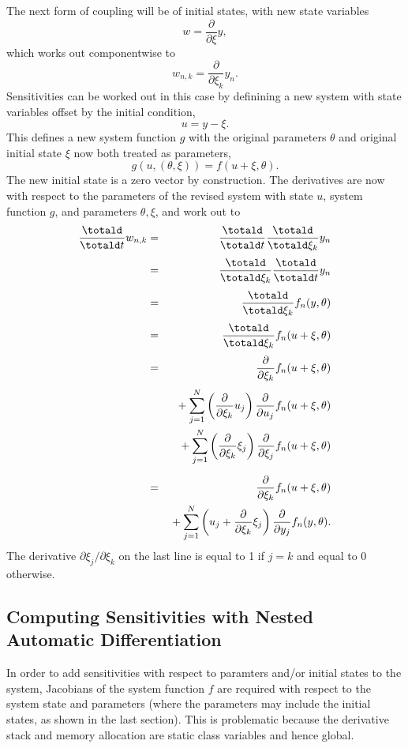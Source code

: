 \documentclass[10pt]{article}
\begin{document}
The next form of coupling will be of initial states, with new state
variables
\[
w = \frac{\partial}{\partial \xi} y,
\]
which works out componentwise to
\[
w_{n,k} = \frac{\partial}{\partial \xi_{k}} y_n.
\]
Sensitivities can be worked out in this case by definining a new
system with state variables offset by the initial condition,
\[
u = y - \xi.
\]
This defines a new system function $g$ with the original parameters
$\theta$ and original initial state $\xi$ now both treated as
parameters,
\[
g(u,(\theta,\xi)) = f(u + \xi, \theta).
\]
The new initial state is a zero vector by construction.  The
derivatives are now with respect to the parameters of the revised
system with state $u$, system function $g$, and parameters
$\theta,\xi$, and work out to
%
\begin{eqnarray*}
\frac{\totald}{\totald t} w_{n,k}
& = & \frac{\totald}{\totald t} \frac{\totald}{\totald \xi_{k}} y_n
\\[3pt]
& = & \frac{\totald}{\totald \xi_k} \frac{\totald}{\totald t} y_n
\\[3pt]
& = & \frac{\totald}{\totald \xi_k} f_n(y,\theta)
\\[3pt]
& = & \frac{\totald}{\totald \xi_k} f_n(u + \xi, \theta)
\\[3pt]
& = & \frac{\partial}{\partial \xi_k} f_n(u + \xi, \theta)
\\[3pt]
& & 
{ } + \sum_{j=1}^N 
        \left( \frac{\partial}{\partial \xi_k} u_j \right)
           \frac{\partial}{\partial u_j} f_n(u + \xi, \theta)
\\
& & 
 { } + \sum_{j=1}^N
         \left( \frac{\partial}{\partial \xi_k} \xi_j \right)
         \frac{\partial}{\partial \xi_j} f_n(u + \xi, \theta)
\\[6pt]
& = & 
\frac{\partial}{\partial \xi_k} f_n(u + \xi, \theta)
\\
& & { } + \sum_{j=1}^N \left( u_j + \frac{\partial}{\partial \xi_k} \xi_j
\right)
\frac{\partial}{\partial y_j} f_n(y,\theta).
\end{eqnarray*}
%
The derivative $\partial \xi_j / \partial \xi_k$ on the last line is
equal to 1 if $j = k$ and equal to 0 otherwise.


\subsection{Computing Sensitivities with Nested Automatic Differentiation}

In order to add sensitivities with respect to paramters and/or initial
states to the system, Jacobians of the system function $f$ are
required with respect to the system state and parameters (where the
parameters may include the initial states, as shown in the last
section).  This is problematic because the derivative stack and memory
allocation are static class variables and hence global.
\end{document}
